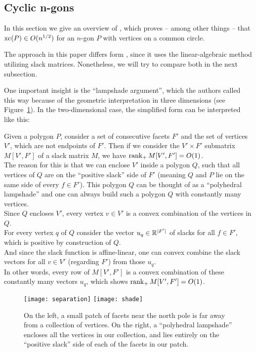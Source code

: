 \subsection{Cyclic n-gons}

In this section we give an overview of \cite{kwan2020extension}, which proves -- among other things -- that $\operatorname{xc}(P) \in O(n^{1/2})$ for an $n$-gon $P$ with vertices on a common circle.

The approach in this paper differs form \cite{shitov2020sublinear}, since it uses the linear-algebraic method utilizing slack matrices. Nonetheless, we will try to compare both in the next subsection.

One important insight is the ``lampshade argument'', which the authors called this way because of the geometric interpretation in three dimensions (see Figure~\ref{fig:lampshade}). In the two-dimensional case, the simplified form can be interpreted like this:

Given a polygon $P$, consider a set of consecutive facets $F'$ and the set of vertices $V'$, which are not endpoints of $F'$. Then if we consider the $V' \times F'$ submatrix $M[V',F']$ of a slack matrix $M$, we have $\operatorname{rank}_+ M[V',F'] = O(1)$.\\
The reason for this is that we can enclose $V'$ inside a polygon $Q$, such that all vertices of $Q$ are on the ``positive slack'' side of $F'$ (meaning $Q$ and $P$ lie on the same side of every $f \in F'$). This polygon $Q$ can be thought of as a ``polyhedral lampshade'' and one can always build such a polygon $Q$ with constantly many vertices.\\
Since $Q$ encloses $V'$, every vertex $v \in V'$ is a convex combination of the vertices in $Q$.\\
For every vertex $q$ of $Q$ consider the vector $u_q \in \mathbb{R}^{\lvert F'\rvert}$ of slacks for all $f \in F'$, which is positive by construction of $Q$.\\
And since the slack function is affine-linear, one can convex combine the slack vectors for all $v \in V'$ (regarding $F'$) from those $u_q$.\\
In other words, every row of $M[V',F']$ is a convex combination of these constantly many vectors $u_q$, which shows $\operatorname{rank}_+ M[V',F'] = O(1)$.

\begin{figure}[h]
  \centering
  \texttt{[image: separation]}
  \texttt{[image: shade]}
  \caption{On the left, a small patch of facets near the north pole is far away from a collection of vertices. On the right, a ``polyhedral lampshade'' encloses all the vertices in our collection, and lies entirely on the ``positive slack'' side of each of the facets in our patch. \cite[Figure 2]{kwan2020extension}}
  \label{fig:lampshade}
\end{figure}

